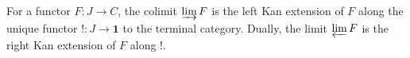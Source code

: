 For a functor $F: J \to C$, the colimit $\varinjlim F$ is the left Kan extension of $F$ along the unique functor $!: J \to \mathbf{1}$ to the terminal category. Dually, the limit $\varprojlim F$ is the right Kan extension of $F$ along $!$.
